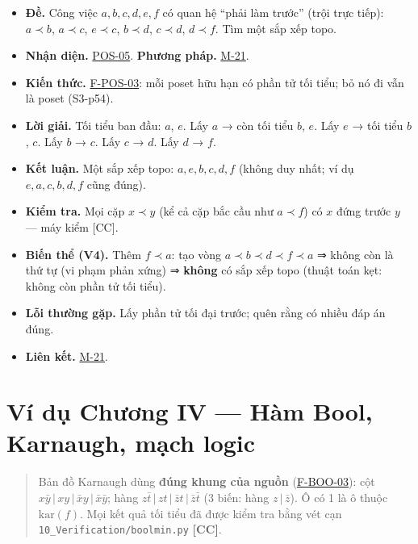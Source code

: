 \documentclass[
  10pt,
  twoside,openany]{book}
\providecommand{\tightlist}{%
  \setlength{\itemsep}{0pt}\setlength{\parskip}{0pt}}
\begin{document}
\begin{itemize}
\tightlist
\item
  \textbf{Đề.} Công việc \(a,b,c,d,e,f\) có quan hệ ``phải làm trước''
  (trội trực tiếp): \(a\prec b\), \(a\prec c\), \(e\prec c\),
  \(b\prec d\), \(c\prec d\), \(d\prec f\). Tìm một sắp xếp topo.
\item
  \textbf{Nhận diện.} \protect\hyperlink{POS-05}{POS-05}. \textbf{Phương
  pháp.} \protect\hyperlink{M-21}{M-21}.
\item
  \textbf{Kiến thức.} \protect\hyperlink{F-POS-03}{F-POS-03}: mỗi poset
  hữu hạn có phần tử tối tiểu; bỏ nó đi vẫn là poset (S3-p54).
\item
  \textbf{Lời giải.} Tối tiểu ban đầu: \(a\), \(e\). Lấy \(a\) → còn tối
  tiểu \(b\), \(e\). Lấy \(e\) → tối tiểu \(b\), \(c\). Lấy \(b\) →
  \(c\). Lấy \(c\) → \(d\). Lấy \(d\) → \(f\).
\item
  \textbf{Kết luận.} Một sắp xếp topo: \(a, e, b, c, d, f\) (không duy
  nhất; ví dụ \(e, a, c, b, d, f\) cũng đúng).
\item
  \textbf{Kiểm tra.} Mọi cặp \(x\prec y\) (kể cả cặp bắc cầu như
  \(a\prec f\)) có \(x\) đứng trước \(y\) --- máy kiểm {[}CC{]}.
\item
  \textbf{Biến thể (V4).} Thêm \(f\prec a\): tạo vòng
  \(a\prec b\prec d\prec f\prec a\) ⇒ không còn là thứ tự (vi phạm phản
  xứng) ⇒ \textbf{không} có sắp xếp topo (thuật toán kẹt: không còn phần
  tử tối tiểu).
\item
  \textbf{Lỗi thường gặp.} Lấy phần tử tối đại trước; quên rằng có nhiều
  đáp án đúng.
\item
  \textbf{Liên kết.} \protect\hyperlink{M-21}{M-21}.
\end{itemize}

\hypertarget{ex-ch4}{%
\chapter{Ví dụ Chương IV --- Hàm Bool, Karnaugh, mạch
logic}\label{ex-ch4}}

\begin{quote}
Bản đồ Karnaugh dùng \textbf{đúng khung của nguồn}
(\protect\hyperlink{F-BOO-03}{F-BOO-03}): cột
\(x\bar y\,|\,xy\,|\,\bar xy\,|\,\bar x\bar y\); hàng
\(z\bar t\,|\,zt\,|\,\bar zt\,|\,\bar z\bar t\) (3 biến: hàng
\(z\,|\,\bar z\)). Ô có 1 là ô thuộc \(\mathrm{kar}(f)\). Mọi kết quả
tối tiểu đã được kiểm tra bằng vét cạn
\texttt{10\_Verification/boolmin.py} \textbf{{[}CC{]}}.
\end{quote}
\end{document}
